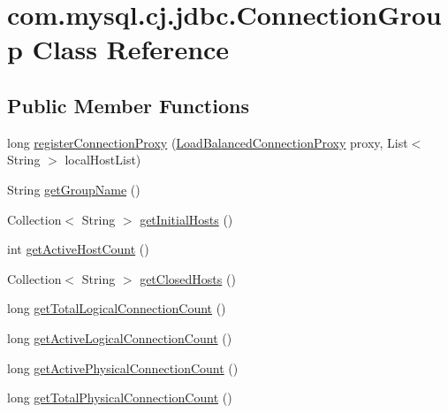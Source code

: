 \hypertarget{classcom_1_1mysql_1_1cj_1_1jdbc_1_1_connection_group}{}\section{com.\+mysql.\+cj.\+jdbc.\+Connection\+Group Class Reference}
\label{classcom_1_1mysql_1_1cj_1_1jdbc_1_1_connection_group}
\subsection*{Public Member Functions}
\begin{DoxyCompactItemize}
\item 
long \mbox{\hyperlink{classcom_1_1mysql_1_1cj_1_1jdbc_1_1_connection_group_a00ef74169d8d33fcfd16c0e1ec710050}{register\+Connection\+Proxy}} (\mbox{\hyperlink{classcom_1_1mysql_1_1cj_1_1jdbc_1_1ha_1_1_load_balanced_connection_proxy}{Load\+Balanced\+Connection\+Proxy}} proxy, List$<$ String $>$ local\+Host\+List)
\item 
String \mbox{\hyperlink{classcom_1_1mysql_1_1cj_1_1jdbc_1_1_connection_group_ad33eec800f439c1b43d4d6f169601113}{get\+Group\+Name}} ()
\item 
Collection$<$ String $>$ \mbox{\hyperlink{classcom_1_1mysql_1_1cj_1_1jdbc_1_1_connection_group_a24a09f1c98e51cae302c5d89aa07a906}{get\+Initial\+Hosts}} ()
\item 
int \mbox{\hyperlink{classcom_1_1mysql_1_1cj_1_1jdbc_1_1_connection_group_ada9879a96ae8b6ab62909c36c6ec4c0e}{get\+Active\+Host\+Count}} ()
\item 
Collection$<$ String $>$ \mbox{\hyperlink{classcom_1_1mysql_1_1cj_1_1jdbc_1_1_connection_group_a550b8887e3871ddc0fa80085a8afe587}{get\+Closed\+Hosts}} ()
\item 
long \mbox{\hyperlink{classcom_1_1mysql_1_1cj_1_1jdbc_1_1_connection_group_a5ba84e80b4fe2df7a8d4bb28fa031faa}{get\+Total\+Logical\+Connection\+Count}} ()
\item 
long \mbox{\hyperlink{classcom_1_1mysql_1_1cj_1_1jdbc_1_1_connection_group_a6c1b7d93c51de858b6d4077b8c713623}{get\+Active\+Logical\+Connection\+Count}} ()
\item 
long \mbox{\hyperlink{classcom_1_1mysql_1_1cj_1_1jdbc_1_1_connection_group_aac9a017ad36cd01dbd3dbcb0f69ee84d}{get\+Active\+Physical\+Connection\+Count}} ()
\item 
long \mbox{\hyperlink{classcom_1_1mysql_1_1cj_1_1jdbc_1_1_connection_group_a86aa431aec7b581a40ea1a05fa3be09b}{get\+Total\+Physical\+Connection\+Count}} ()

\end{DoxyCompactItemize}
